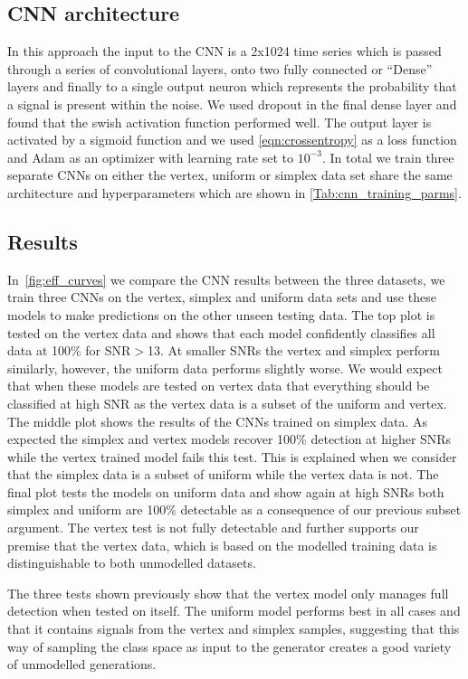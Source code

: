 \documentclass[12pt]{iopart}
\begin{document}
\subsection{CNN architecture}
In this approach the input to the \ac{CNN} is a 2x1024 time series which is passed through a series of convolutional layers, onto two fully connected or ``Dense'' layers and finally to a single output neuron which represents the probability that a signal is present within the noise. We used dropout in the final dense layer and found that the swish activation \cite{ramachandran2017searching} function performed well. The output layer is activated by a sigmoid function and we used \cref{eqn:crossentropy} as a loss function and Adam as an optimizer with learning rate set to $10^{-3}$. In total we train three separate \acp{CNN} on either the vertex, uniform or simplex data set share the same architecture and hyperparameters which are shown in \cref{Tab:cnn_training_parms}.


\subsection{Results}
In~\cref{fig:eff_curves} we compare the \ac{CNN} results between the three
datasets, we train three \acp{CNN} on the vertex, simplex and uniform data sets
and use these models to make predictions on the other unseen testing data. The top plot is tested on the vertex data and shows that each model confidently classifies all data at 100\% for SNR$>$13. At smaller SNRs the vertex and simplex perform similarly, however, the uniform data performs slightly worse. We would expect that when these models are tested on vertex data that everything should be classified at high SNR as the vertex data is a subset of the uniform and vertex. The middle plot shows the results of the CNNs trained on simplex data.  As expected the simplex and vertex models recover 100\% detection at higher SNRs while the vertex trained model fails this test. This is explained when we consider that the simplex data is a subset of uniform while the vertex data is not. The final plot tests the models on uniform data and show again at high SNRs both simplex and uniform are 100\% detectable as a consequence of our previous subset argument. The vertex test is not fully detectable and further supports our premise that the vertex data, which is based on the modelled training data is distinguishable to both unmodelled datasets. 

The three tests shown previously show that the vertex model only manages full detection when tested on itself. The uniform model performs best in all cases and that it contains signals from the vertex and simplex samples, suggesting that this way of sampling the class space as input to the generator creates a good variety of unmodelled generations. 
\end{document}
